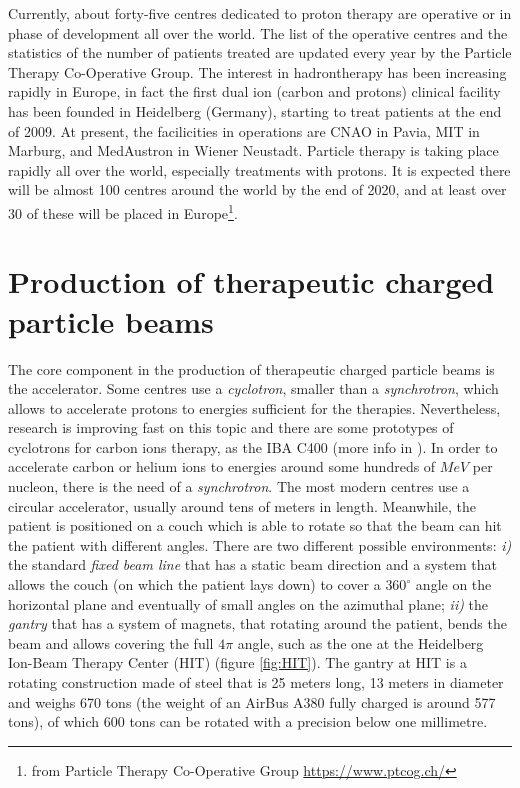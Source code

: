 \documentclass[12pt, a4paper, twoside]{book}
\begin{document}
Currently, about forty-five centres dedicated to proton therapy are operative or in phase of development all over the world. The list of the operative centres and the statistics of the number of patients treated are updated every year by the Particle Therapy Co-Operative Group.
The interest in hadrontherapy has been increasing rapidly in Europe, in fact the first dual ion (carbon and protons) clinical facility has been founded in Heidelberg (Germany), starting to treat patients at the end of 2009. At present, the facilicities in operations are CNAO in Pavia, MIT in Marburg, and MedAustron in Wiener Neustadt. Particle therapy is taking place rapidly all over the world, especially treatments with protons. It is expected there will be almost 100 centres around the world by the end of 2020, and at least over 30 of these will be placed in Europe\footnote{from Particle Therapy Co-Operative Group \url{https://www.ptcog.ch/}}.


\section{Production of therapeutic charged particle beams}
The core component in the production of therapeutic charged particle beams is the accelerator. Some centres use a \emph{cyclotron}, smaller than a \emph{synchrotron}, which allows to accelerate protons to energies sufficient for the therapies. Nevertheless, research is improving fast on this topic and there are some prototypes of cyclotrons for carbon ions therapy, as the IBA C400 (more info in \cite{jong:iba}). In order to accelerate carbon or helium ions to energies around some hundreds of $MeV$ per nucleon, there is the need of a \emph{synchrotron}. The most modern centres use a circular accelerator, usually around tens of meters in length. Meanwhile, the patient is positioned on a couch which is able to rotate so that the beam can hit the patient with different angles. There are two different possible environments: \emph{i)} the standard \emph{fixed beam line} that has a static beam direction and a system that allows the couch (on which the patient lays down) to cover a $360^\circ$ angle on the horizontal plane and eventually of small angles on the azimuthal plane; \emph{ii)} the \emph{gantry} that has a system of magnets, that rotating around the patient, bends the beam and allows covering the full $4\pi$ angle, such as the one at the Heidelberg Ion-Beam Therapy Center (HIT) (figure \ref{fig:HIT}). The gantry at HIT is a rotating construction made of steel that is 25 meters long, 13 meters in diameter and weighs 670 tons (the weight of an AirBus A380 fully charged is around 577 tons), of which 600 tons can be rotated with a precision below one millimetre. 
\end{document}
